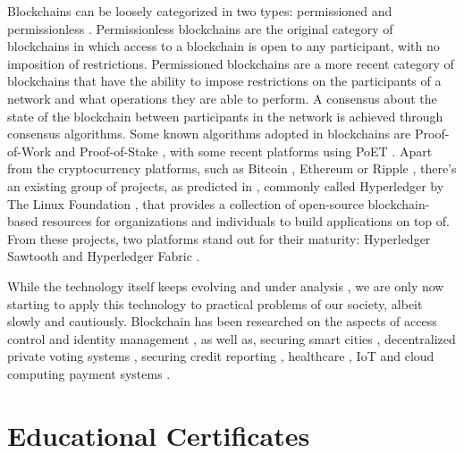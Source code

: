 Blockchains can be loosely categorized in two types: permissioned and permissionless \cite{pilkington_blockchain_2016, yaga_blockchain_2018}. Permissionless blockchains are the original category of blockchains in which access to a blockchain is open to any participant, with no imposition of restrictions. Permissioned blockchains are a more recent category of blockchains that have the ability to impose restrictions on the participants of a network and what operations they are able to perform. A consensus about the state of the blockchain between participants in the network is achieved through consensus algorithms. Some known algorithms adopted in blockchains are Proof-of-Work \cite{nakamoto_bitcoin:_2008} and Proof-of-Stake \cite{king_ppcoin:_2012}, with some recent platforms using PoET \cite{intel_poet}. Apart from the cryptocurrency platforms, such as Bitcoin  \cite{nakamoto_bitcoin:_2008}, Ethereum \cite{buterin_next-generation_2013} or Ripple \cite{schwartz_ripple_2014}, there's an existing group of projects, as predicted in \cite{buterin_next-generation_2013}, commonly called Hyperledger by The Linux Foundation \cite{linuxfoundation}, that provides a collection of open-source blockchain-based resources for organizations and individuals to build applications on top of. From these projects, two platforms stand out for their maturity: Hyperledger Sawtooth \cite{hyperledger_sawtooth} and Hyperledger Fabric \cite{hyperledger_fabric}.

While the technology itself keeps evolving and under analysis \cite{eyal_bitcoin-ng:_2016, lin_survey_2017, narayanan_bitcoins_2017}, we are only now starting to apply this technology to practical problems of our society, albeit slowly and cautiously. Blockchain has been researched on the aspects of access control \cite{maesa_blockchain_2017} and identity management \cite{augot_identity_2017, yasin_online_2016}, as well as, securing smart cities \cite{biswas_securing_2016}, decentralized private voting systems \cite{sheer_hardwick_e-voting_2018}, securing credit reporting \cite{kafshdar_goharshady_secure_2018}, healthcare \cite{azaria_medrec:_2016}, IoT \cite{christidis_blockchains_2016, ouaddah_access_2017, dorri_blockchain_2017, ouaddah_fairaccess:_2017} and cloud computing payment systems \cite{zhang_blockchain_2018}.

\section{Educational Certificates}
\label{sec:related-ec}

